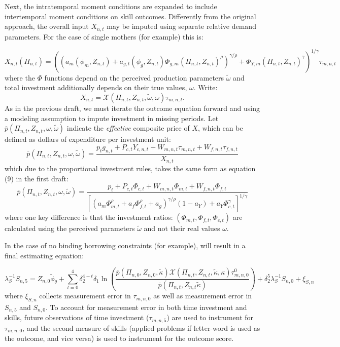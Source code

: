 \documentclass{article}
\begin{document}
Next, the intratemporal moment conditions are expanded to include intertemporal moment conditions on skill outcomes. Differently from the original approach, the overall input $X_{n,t}$ may be imputed using separate relative demand parameters. For the case of single mothers (for example) this is:

\[ X_{n,t}(\Pi_{n,t}) = \left(\left(a_{m}(\phi_{m},Z_{n,t}) + a_{g,t}(\phi_{g},Z_{n,t})\Phi_{g,m}(\Pi_{n,t},Z_{n,t})^\rho\right)^{\gamma/
\rho} + \Phi_{Y,m}(\Pi_{n,t},Z_{n,t})^\gamma\right)^{1/\gamma}\tau_{m,n,t}
 \]
where the $\Phi$ functions depend on the perceived production parameters $\tilde{\omega}$ and total investment additionally depends on their true values, $\omega$. Write:
\[ X_{n,t} = \mathcal{X}(\Pi_{n,t},Z_{n,t},\tilde{\omega},\omega)\tau_{m,n,t}.\]
As in the previous draft, we must iterate the outcome equation forward and using a modeling assumption to impute investment in missing periods. Let $\overline{p}(\Pi_{n,t},Z_{n,t},\omega,\tilde{\omega})$ indicate the \emph{effective} composite price of $X$, which can be defined as dollars of expenditure per investment unit:
\[ \overline{p}(\Pi_{n,t},Z_{n,t},\omega,\tilde{\omega}) = \frac{p_{t}g_{n,t}+P_{c,t}Y_{c,n,t}+W_{m,n,t}\tau_{m,n,t}+W_{f,n,t}\tau_{f,n,t}}{X_{n,t}} \]
which due to the proportional investment rules, takes the same form as equation (9) in the first draft:
\[ \overline{p}(\Pi_{n,t},Z_{n,t},\omega,\tilde{\omega}) = \frac{p_{t}+P_{c,t}\Phi_{c,t}+W_{m,n,t}\Phi_{m,t}+W_{f,n,t}\Phi_{f,t}}{\left[\left(a_{m}\Phi_{m,t}^\rho+a_{f}\Phi_{f,t}^\rho+a_{g}\right)^{\gamma / \rho}(1-a_{Y}) + a_{Y}\Phi_{c,t}^{\gamma}\right]^{1/\gamma}} \]
where one key difference is that the investment ratios: $(\Phi_{m,t},\Phi_{f,t},\Phi_{c,t})$ are calculated using the perceived parameters $\tilde{\omega}$ and not their real values $\omega$.

In the case of no binding borrowing constraints (for example), will result in a final estimating equation:

\[\lambda^{-1}_{S}S_{n,5} = Z_{n,0}\tilde{\phi}_\theta + \sum_{t=0}^4\delta_{2}^{4-t}\delta_{1}\ln\left(\frac{\overline{p}(\Pi_{n,0},Z_{n,0},\tilde{\kappa})\mathcal{X}(\Pi_{n,t},Z_{n,t},\tilde{\kappa},\kappa)\tau^0_{m,n,0}}{\overline{p}(\Pi_{n,t},Z_{n,t}\tilde{\kappa})}\right) + \delta^5_{2}\lambda_{S}^{-1}S_{n,0} + \xi_{S,n} \]
where $\xi_{S,n}$ collects measurement error in $\tau_{m,n,0}$ as well as measurement error in $S_{n,5}$ and $S_{n,0}$. To account for measurement error in both time investment and skills, future observations of time investment ($\tau_{m,n,5}$) are used to instrument for $\tau_{m,n,0}$, and the second measure of skills (applied problems if letter-word is used as the outcome, and vice versa) is used to instrument for the outcome score.
\end{document}
